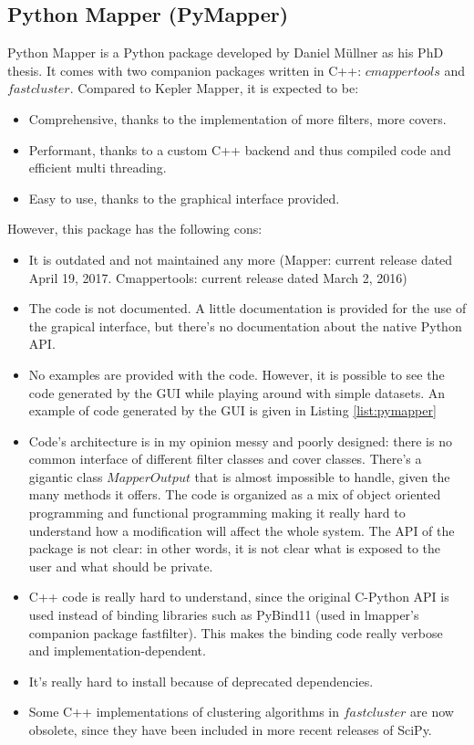 \subsection{Python Mapper (PyMapper)}
Python Mapper is a Python package developed by Daniel M\"ullner as his PhD thesis. It comes with two companion packages written in C++: $cmappertools$ and $fastcluster$. Compared to Kepler Mapper, it is expected to be:
\begin{itemize}
	\item Comprehensive, thanks to the implementation of more filters, more covers.
	\item Performant, thanks to a custom C++ backend and thus compiled code and efficient multi threading.
	\item Easy to use, thanks to the graphical interface provided.
\end{itemize}

However, this package has the following cons:
\begin{itemize}
\item It is outdated and not maintained any more (Mapper: current release dated April 19, 2017. Cmappertools: current release dated March 2, 2016)
\item The code is not documented. A little documentation is provided for the use of the grapical interface, but there's no documentation about the native Python API.
\item No examples are provided with the code. However, it is possible to see the code generated by the GUI while playing around with simple datasets. An example of code generated by the GUI is given in Listing \ref{list:pymapper}
\item Code's architecture is in my opinion messy and poorly designed: there is no common interface of different filter classes and cover classes. There's a gigantic class $MapperOutput$ that is almost impossible to handle, given the many methods it offers. The code is organized as a mix of object oriented programming and functional programming making it really hard to understand how a modification will affect the whole system. The API of the package is not clear: in other words, it is not clear what is exposed to the user and what should be private.
\item C++ code is really hard to understand, since the original C-Python API is used instead of binding libraries such as PyBind11 (used in lmapper's companion package fastfilter). This makes the binding code really verbose and implementation-dependent.
\item It's really hard to install because of deprecated dependencies.
\item Some C++ implementations of clustering algorithms in $fastcluster$ are now obsolete, since they have been included in more recent releases of SciPy.
\end{itemize}

